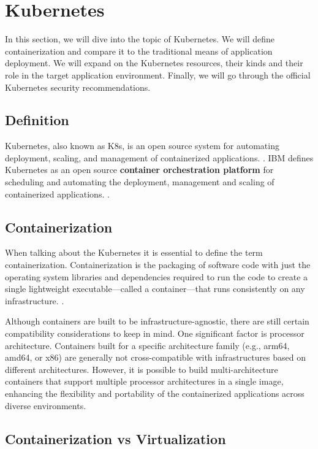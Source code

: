 \section{Kubernetes}

In this section, we will dive into the topic of Kubernetes. We will define containerization and compare it to the traditional means of application deployment. We will expand on the Kubernetes resources, their kinds and their role in the target application environment. Finally, we will go through the official Kubernetes security recommendations.

\subsection{Definition}

Kubernetes, also known as K8s, is an open source system for automating deployment, scaling, and management of containerized applications. \cite{kubernetes}.
IBM defines Kubernetes as an open source \textbf{container orchestration platform} for scheduling and automating the deployment, management and scaling of containerized applications. \cite{ibm-kubernetes}.

\subsection{Containerization}

When talking about the Kubernetes it is essential to define the term containerization. Containerization is the packaging of software code with just the operating system libraries and dependencies required to run the code to create a single lightweight executable—called a container—that runs consistently on any infrastructure. \cite{ibm-containerization}.

Although containers are built to be infrastructure-agnostic, there are still certain compatibility considerations to keep in mind. One significant factor is processor architecture. Containers built for a specific architecture family (e.g., arm64, amd64, or x86) are generally not cross-compatible with infrastructures based on different architectures. However, it is possible to build multi-architecture containers that support multiple processor architectures in a single image, enhancing the flexibility and portability of the containerized applications across diverse environments.

\subsection{Containerization vs Virtualization}

